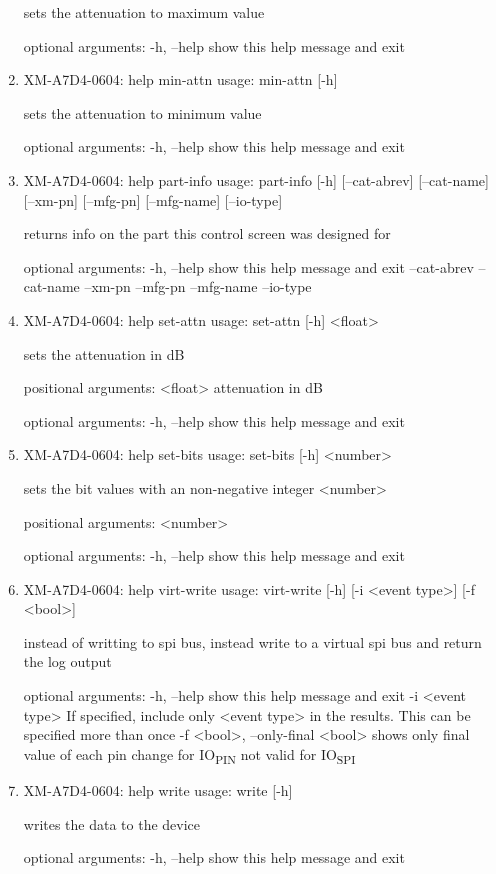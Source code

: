 \documentclass[11pt]{article}
\begin{document}
\begin{enumerate}
sets the attenuation to maximum value

optional arguments:
  -h, --help  show this help message and exit

\item XM-A7D4-0604: help min-attn
\label{sec:org8106e0a}
usage: min-attn [-h]

sets the attenuation to minimum value

optional arguments:
  -h, --help  show this help message and exit

\item XM-A7D4-0604: help part-info
\label{sec:org8189101}
usage: part-info  [-h] [--cat-abrev] [--cat-name] [--xm-pn] [--mfg-pn] [--mfg-name]
        [--io-type]

returns info on the part this control screen was designed for

optional arguments:
  -h, --help   show this help message and exit
  --cat-abrev
  --cat-name
  --xm-pn
  --mfg-pn
  --mfg-name
  --io-type

\item XM-A7D4-0604: help set-attn
\label{sec:orgc36af82}
usage: set-attn [-h] <float>

sets the attenuation in dB

positional arguments:
  <float>     attenuation in dB

optional arguments:
  -h, --help  show this help message and exit

\item XM-A7D4-0604: help set-bits
\label{sec:org8da39ac}
usage: set-bits [-h] <number>

sets the bit values with an non-negative integer <number>

positional arguments:
  <number>

optional arguments:
  -h, --help  show this help message and exit

\item XM-A7D4-0604: help virt-write
\label{sec:org954b7f8}
usage: virt-write [-h] [-i <event type>] [-f <bool>]

instead of writting to spi bus, instead write to a virtual spi bus and return
the log output

optional arguments:
  -h, --help            show this help message and exit
  -i <event type>       If specified, include only <event type> in the
                        results. This can be specified more than once
  -f <bool>, --only-final <bool>
                        shows only final value of each pin change for IO\textsubscript{PIN}
                        not valid for IO\textsubscript{SPI}

\item XM-A7D4-0604: help write
\label{sec:orgba3f448}
usage: write [-h]

writes the data to the device

optional arguments:
  -h, --help  show this help message and exit
\end{enumerate}
\end{document}
